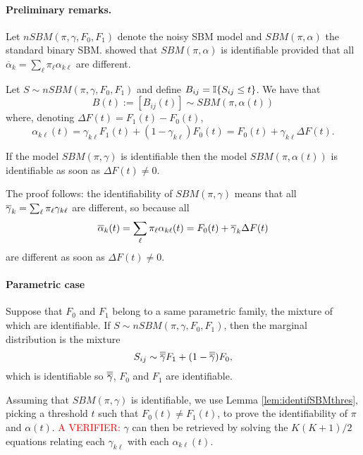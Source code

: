 \paragraph{Preliminary remarks.}
Let $nSBM(\pi, \gamma, F_0, F_1)$ denote the noisy SBM model and $SBM(\pi, \alpha)$ the standard binary SBM. \cite{CDP12} showed that $SBM(\pi, \alpha)$ is identifiable provided that all $\overline{\alpha}_k = \sum_\ell \pi_\ell \alpha_{k\ell}$ are different.

\begin{lemma} \label{lem:SBMthres}
 Let $S \sim nSBM(\pi, \gamma, F_0, F_1)$ and define $B_{ij} = \mathbb I\{S_{ij} \leq t\}$. We have that 
 $$
 B(t) := [B_{ij}(t)] \sim SBM(\pi, \alpha(t))
 $$
 where, denoting $\Delta F(t) = F_1(t) - F_0(t)$,
 $$
 \alpha_{k\ell}(t) 
 = \gamma_{k\ell} F_1(t) + (1 - \gamma_{k\ell}) F_0(t)
 = F_0(t) + \gamma_{k\ell} \Delta F(t). 
 $$
\end{lemma}

\begin{lemma} \label{lem:identifSBMthres}
  If the model $SBM(\pi, \gamma)$ is identifiable then the model $SBM(\pi, \alpha(t))$ is identifiable as soon as $\Delta F(t) \neq 0$.
\end{lemma}

The proof follows: the identifiability of $SBM(\pi, \gamma)$ means that all $\overline{\gamma}_k  = \sum_\ell \pi_\ell \gamma_{k\ell}$ are different, so because all 
$$
\overline{\alpha}_k(t) = \sum_\ell \pi_\ell \alpha_{k\ell}(t) = F_0(t) + \overline{\gamma}_k \Delta F(t)
$$
are different as soon as $\Delta F(t) \neq 0$.

\paragraph{Parametric case}
Suppose that $F_0$ and $F_1$ belong to a same parametric family, the mixture of which are identifiable. If $S \sim nSBM(\pi, \gamma, F_0, F_1)$, then the marginal distribution is the mixture
$$
S_{ij} \sim \overline{\overline{\gamma}} F_1 + (1 - \overline{\overline{\gamma}}) F_0,
$$
which is identifiable so $\overline{\overline{\gamma}}$, $F_0$ and $F_1$ are identifiable.

Assuming that $SBM(\pi, \gamma)$ is identifiable, we use Lemma \ref{lem:identifSBMthres}, picking a threshold $t$ such that $F_0(t) \neq F_1(t)$, to prove the identifiability of $\pi$ and $\alpha(t)$. \textcolor{red}{A VERIFIER:} $\gamma$ can then be retrieved by solving the $K(K+1)/2$ equations relating each $\gamma_{k\ell}$ with each $\alpha_{k\ell}(t)$. 

